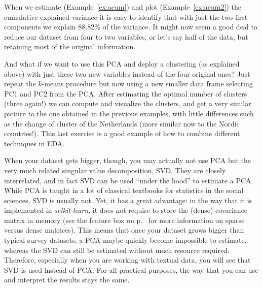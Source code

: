 
When we estimate (Example~\ref{ex:acum}) and plot (Example~\ref{ex:acum2}) the cumulative explained variance it is easy to identify that with just the two first components we explain 88.82\% of the variance. It might now seem a good deal to reduce our dataset from four to two variables, or let’s say half of the data, but retaining most of the original information.


And what if we want to use this PCA and deploy a clustering (as explained above) with just these two new variables instead of the four original ones?  Just repeat the $k$-means procedure but now using a new smaller data frame selecting PC1 and PC2 from the PCA. After estimating the optimal number of clusters (three again!) we can compute and visualize the clusters, and get a very similar picture to the one obtained in the previous examples, with little differences such as the change of cluster of the Netherlands (more similar now to the Nordic countries!). This last exercise is a good example of how to combine different techniques in EDA.


When your dataset gets bigger, though, you may actually not use PCA
but the very much related singular value decomposition, SVD. They are
closely interrelated, and in fact SVD can be used ``under the hood''
to estimate a PCA. While PCA is taught in a lot of classical textbooks
for statistics in the social sciences, SVD is usually not. Yet, it has
a great advantage: in the way that it is implemented in
\emph{scikit-learn}, it does not require to store the (dense)
covariance matrix in memory (see the feature box
on p.~\pageref{feature:sparse} for more information on sparse versus dense
matrices). This means that once your dataset grows bigger than
typical survey datasets, a PCA maybe quickly become impossible to estimate,
whereas the SVD can still be estimated without much resource
required. Therefore, especially when you are working with textual data,
you will see that SVD is used instead of PCA. For all practical
purposes, the way that  you can use and interpret the results stays the
same.

